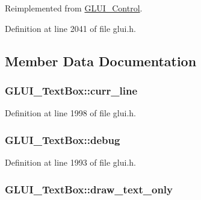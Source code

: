 Reimplemented from \hyperlink{class_g_l_u_i___control_a42a65c9dbc0690e270a8c0033fbc1845}{G\+L\+U\+I\+\_\+\+Control}.



Definition at line 2041 of file glui.\+h.



\subsection{Member Data Documentation}
\hypertarget{class_g_l_u_i___text_box_a965e17d22020a0e94bdae6e1147c8c15}{
\subsubsection[{curr\+\_\+line}]{ G\+L\+U\+I\+\_\+\+Text\+Box\+::curr\+\_\+line}}\label{class_g_l_u_i___text_box_a965e17d22020a0e94bdae6e1147c8c15}


Definition at line 1998 of file glui.\+h.

\hypertarget{class_g_l_u_i___text_box_ae9ef94fc5046cc0471bb889c61f49017}{
\subsubsection[{debug}]{ G\+L\+U\+I\+\_\+\+Text\+Box\+::debug}}\label{class_g_l_u_i___text_box_ae9ef94fc5046cc0471bb889c61f49017}


Definition at line 1993 of file glui.\+h.

\hypertarget{class_g_l_u_i___text_box_adeb398dd089cbf4f5fbb99748b5122ea}{
\subsubsection[{draw\+\_\+text\+\_\+only}]{ G\+L\+U\+I\+\_\+\+Text\+Box\+::draw\+\_\+text\+\_\+only}}\label{class_g_l_u_i___text_box_adeb398dd089cbf4f5fbb99748b5122ea}


